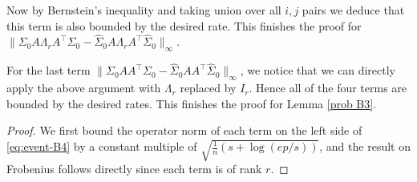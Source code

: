 \documentclass[11pt]{article}
\newcommand{\so}{\widehat{\Sigma}_0}
\newcommand{\0}{{\mathbf{0}}}
\begin{document}
Now by Bernstein's inequality and taking union over all $i,j$ pairs we deduce that this term is also bounded by the desired rate. This finishes the proof for $\|\Sigma_0A\Lambda_rA^\top\Sigma_0-\so A\Lambda_r A^\top\so\|_\infty$.
\par For the last term $\|\Sigma_0AA^\top\Sigma_0-\so AA^\top\so\|_\infty$, we notice that we can directly apply the above argument with $\Lambda_r$ replaced by $I_r$. Hence all of the four terms are bounded by the desired rates. This finishes the proof for Lemma \ref{prob B3}.
\fi


\begin{proof}
We first bound the operator norm of each term on the left side of \eqref{eq:event-B4} by a constant multiple of ${\sqrt{\frac{1}{n}(s + \log(ep/s))}}$, and the result on Frobenius follows directly since each term is of rank $r$. 


\end{proof}
\end{document}
